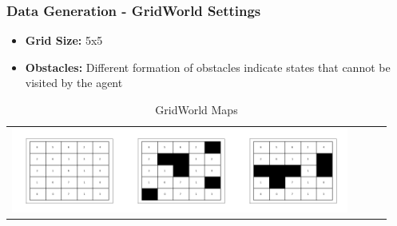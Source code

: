 \documentclass{beamer}
\begin{document}
\begin{frame}
    \frametitle{Data Generation - GridWorld Settings}
        \begin{itemize}
            \item \textbf{Grid Size:} 5x5
            \item \textbf{Obstacles:} Different formation of obstacles indicate states that cannot be visited by the agent
        \end{itemize}

        \newcommand{\addmapa}{\includegraphics[width=10em]{data/Model1/5x5;4;free.png}}
        \newcommand{\addmapb}{\includegraphics[width=10em]{data/Model2/5x5;4;6box.png}}
        \newcommand{\addmapc}{\includegraphics[width=10em]{data/Model3/5x5;4;6sep.png}}
        \begin{table}[H]
        \sffamily
        \centering
        \begin{tabular}{l*3{C}@{}}
        \addmapa \addmapb \addmapc \\
        \end{tabular}
        \caption{GridWorld Maps}
        \end{table}
\end{frame}
\end{document}
